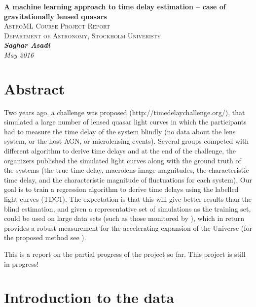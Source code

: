 \documentclass[a4paper, 11pt]{article}
\begin{document}
\begin{titlepage}
   \begin{center}
      \LARGE\textbf{A machine learning approach to time delay estimation -- case of gravitationally lensed quasars}\\
      \vspace{20mm}
      \Large\textsc{AstroML Course Project Report}\\
      \Large\textsc{Department of Astronomy, Stockholm Univeristy}\\
      \vspace{50mm}
      \Large\textbf{\textit{Saghar Asadi}\\}
      \vspace{20mm}
      \Large\textit{May 2016}
   \end{center}
\end{titlepage}

\section{Abstract}
Two years ago, a challenge was proposed (http://timedelaychallenge.org/), that simulated a large number of lensed quasar light curves in which the participants had to measure the time delay of the system blindly (no data about the lens system, or the host AGN, or microlensing events).  Several groups competed with different algorithm to derive time delays and at the end of the challenge, the organizers published the simulated light curves along with the ground truth of the systems (the true time delay, macrolens image magnitudes, the characteristic time delay, and the characteristic magnitude of fluctuations for each system). Our goal is to train a regression algorithm to derive time delays using the labelled light curves (TDC1). The expectation is that this will give better results than the blind estimation, and given a representative set of simulations as the training set, could be used on large data sets (such as those monitored by \citep{LSST+2009}), which in return provides a robust measurement for the accelerating expansion of the Universe (for the proposed method see \citet{Refsdal1964}).

This is a report on the partial progress of the project so far. This project is still in progress!

\section{Introduction to the data}
\end{document}
